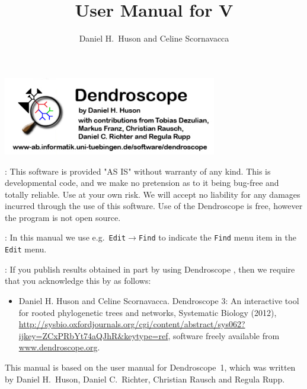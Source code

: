 \documentclass[11pt]{article}
\title{User Manual for \Dendroscope V\VERSION}
\author{Daniel H.~Huson and Celine Scornavacca}
\def\Dendroscope{{\sf Dendroscope }}
\begin{document}

\maketitle

\begin{center}
\includegraphics[width=0.7\textwidth]{./figs/about}
\end{center}

\tableofcontents

:
This software is provided "AS IS" without warranty of any kind. This is 
developmental code, and we make no pretension as to it being bug-free and 
totally reliable. Use at your own risk. We will accept no liability for any 
damages incurred through the use of this software.
Use of the \Dendroscope is free, however the program is not open source.

:
In this manual we use e.g.\ {\tt Edit}$\to${\tt Find} to indicate
the {\tt Find} menu item in the {\tt Edit} menu.

:
If you publish results obtained in part by using \Dendroscope, then we
require that you acknowledge this by  as follows:
\begin{itemize}
\item Daniel H. Huson and Celine Scornavacca. Dendroscope 3: An interactive tool for rooted phylogenetic trees and networks,
Systematic Biology (2012), \url{http://sysbio.oxfordjournals.org/cgi/content/abstract/sys062? ijkey=ZCxPRbYt74aQJhR&keytype=ref},
software freely available from
\href{http://www.dendroscope.org}{www.dendroscope.org}.
\end{itemize}

This manual is based on the user manual for Dendroscope~1, which was written by
Daniel H.~Huson, Daniel C.~Richter, Christian Rausch and Regula Rupp.
\end{document}
